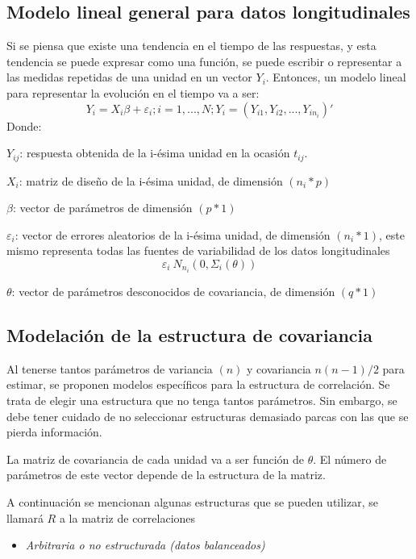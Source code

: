 \documentclass[12pt]{article}
\begin{document}
\subsection{Modelo lineal general para datos longitudinales}

Si se piensa que existe una tendencia en el tiempo de las respuestas, y esta tendencia se puede expresar como una función,
se puede escribir o representar a las medidas repetidas de una unidad en un vector $Y_i$. Entonces, un modelo lineal para
representar la evolución en el tiempo va a ser:
\[ Y_i = X_i\beta + \varepsilon_i; i = 1, ..., N; Y_i = (Y_{i1}, Y_{i2}, ..., Y_{in_{i}})' \]
Donde:

$Y_{ij}$: respuesta obtenida de la i-ésima unidad en la ocasión $t_{ij}$.

$X_i$: matriz de diseño de la i-ésima unidad, de dimensión $(n_i*p)$

$\beta $: vector de parámetros de dimensión $(p*1)$

$\varepsilon_i$: vector de errores aleatorios de la i-ésima unidad, de dimensión $(n_i*1)$, este mismo representa todas
las fuentes de variabilidad de los datos longitudinales
\[ \varepsilon_i ~ N_{n_i}(0, \varSigma_i(\theta )) \]

$\theta$: vector de parámetros desconocidos de covariancia, de dimensión $(q*1)$

\subsection{Modelación de la estructura de covariancia}

Al tenerse tantos parámetros de variancia $(n)$ y covariancia $n(n-1)/2$ para estimar, se proponen modelos específicos
para la estructura de correlación. Se trata de elegir una estructura que no tenga tantos parámetros. Sin embargo, se debe
tener cuidado de no seleccionar estructuras demasiado parcas con las que se pierda información.

La matriz de covariancia de cada unidad va a ser función de $\theta$. El número de parámetros de este vector depende de la
estructura de la matriz.

A continuación se mencionan algunas estructuras que se pueden utilizar, se llamará $R$ a la matriz de correlaciones

\begin{itemize}
	\item \emph{Arbitraria o no estructurada (datos balanceados)}
\end{itemize}
\end{document}
